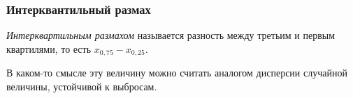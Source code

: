\subsubsection{Интерквантильный размах}

\begin{defn}
    \textit{Интерквартильным размахом} называется разность между третьим и первым квартилями, то есть ${\displaystyle x_{0{,}75}-x_{0{,}25}}.$
\end{defn} 

В каком-то смысле эту величину можно считать аналогом дисперсии случайной величины, устойчивой к выбросам.
